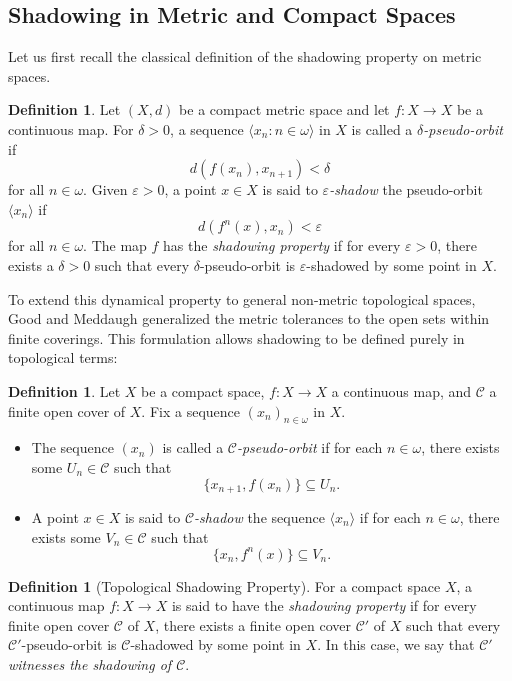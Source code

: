 \documentclass[12pt]{amsart}
\theoremstyle{definition}
\newtheorem{definition}[theorem]{Definition}
\numberwithin{equation}{section}
\theoremstyle{remark}
\begin{document}
\subsection{Shadowing in Metric and Compact Spaces}
 Let us first recall the classical definition of the shadowing property on metric spaces.

\begin{definition}\label{shadmet}
Let $(X, d)$ be a compact metric space and let $f:X \to X$ be a continuous map. For $\delta > 0$, a sequence $\langle x_n : n \in \omega \rangle$ in $X$ is called a \emph{$\delta$-pseudo-orbit} if 
\[
d(f(x_n), x_{n+1}) < \delta
\]
for all $n \in \omega$. Given $\varepsilon > 0$, a point $x \in X$ is said to \emph{$\varepsilon$-shadow} the pseudo-orbit $\langle x_n \rangle$ if 
\[
d(f^n(x), x_n) < \varepsilon
\]
for all $n \in \omega$. The map $f$ has the \emph{shadowing property} if for every $\varepsilon > 0$, there exists a $\delta > 0$ such that every $\delta$-pseudo-orbit is $\varepsilon$-shadowed by some point in $X$.
\end{definition}

To extend this dynamical property to general non-metric topological spaces, Good and Meddaugh \cite{GM} generalized the metric tolerances to the open sets within finite coverings. This formulation allows shadowing to be defined purely in topological terms:

\begin{definition}\label{shadcom}
Let $X$ be a compact space, $f: X \to X$ a continuous map, and $\mathcal{C}$ a finite open cover of $X$. Fix a sequence $(x_n)_{n \in \omega}$ in $X$.
\begin{itemize}
\item The sequence $(x_n)$ is called a \emph{$\mathcal{C}$-pseudo-orbit} if for each $n \in \omega$, there exists some $U_n \in \mathcal{C}$ such that 
\[
\{x_{n+1}, f(x_n)\} \subseteq U_n.
\]
\item A point $x \in X$ is said to \emph{$\mathcal{C}$-shadow} the sequence $\langle x_n \rangle$ if for each $n \in \omega$, there exists some $V_n \in \mathcal{C}$ such that 
\[
\{x_n, f^n(x)\} \subseteq V_n.
\]
\end{itemize}
\end{definition}

\begin{definition}[Topological Shadowing Property]
For a compact space $X$, a continuous map $f: X \to X$ is said to have the \emph{shadowing property} if for every finite open cover $\mathcal{C}$ of $X$, there exists a finite open cover $\mathcal{C}'$ of $X$ such that every $\mathcal{C}'$-pseudo-orbit is $\mathcal{C}$-shadowed by some point in $X$. In this case, we say that $\mathcal{C}'$ \emph{witnesses the shadowing of $\mathcal{C}$}.
\end{definition}
\end{document}
